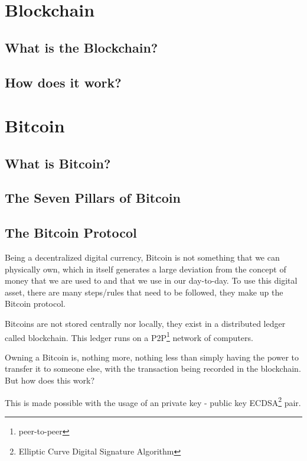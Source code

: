 \documentclass{article}
\newcommand\tab[1][1cm]{\hspace*{#1}}
\begin{document}
\section{Blockchain}

\subsection{What is the Blockchain?}

\subsection{How does it work?}

\section{Bitcoin}

\subsection{What is Bitcoin?}

\subsection{The Seven Pillars of Bitcoin}

\subsection{The Bitcoin Protocol}

\tab Being a decentralized digital currency, Bitcoin is not something that we can physically own, which in itself generates a large deviation from the concept of money that we are used to and that we use in our day-to-day. To use this digital asset, there are many steps/rules that need to be followed, they make up the Bitcoin protocol.

Bitcoins are not stored centrally nor locally, they exist in a distributed ledger called blockchain. This ledger runs on a P2P\footnote{peer-to-peer} network of computers. 

Owning a Bitcoin is, nothing more, nothing less than simply having the power to transfer it to someone else, with the transaction being recorded in the blockchain. But how does this work?

This is made possible with the usage of an private key - public key ECDSA\footnote{Elliptic Curve Digital Signature Algorithm} pair.
\end{document}
